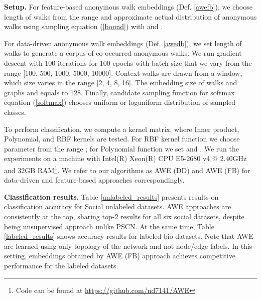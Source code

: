 \documentclass{article}
\theoremstyle{definition}
\begin{document}
\textbf{Setup.}
For feature-based anonymous walk embeddings (Def. \ref{awefb}), we choose length  of walks from the range  and approximate actual distribution of anonymous walks using sampling equation (\ref{bound}) with  and . 

For data-driven anonymous walk embeddings (Def. \ref{awedb}), we set length of walks  to generate a corpus of co-occurred anonymous walks. We run gradient descent with 100 iterations for 100 epochs with batch size that we vary from the range [100, 500, 1000, 5000, 10000]. Context walks are drawn from a window, which size varies in the range [2, 4, 8, 16]. The embedding size of walks and graphs   and  equals to 128. Finally, candidate sampling function for softmax equation (\ref{softmax}) chooses uniform or loguniform distribution of sampled classes. 

To perform classification, we compute a kernel matrix, where Inner product, Polynomial, and RBF kernels are tested. For RBF kernel function we choose parameter  from the range ; for Polynomial function we set  and . We run the experiments on a machine with Intel(R) Xeon(R) CPU E5-2680 v4 @ 2.40GHz and 32GB RAM\footnote{Code can be found at \url{https://github.com/nd7141/AWE}}. We refer to our algorithms as AWE (DD) and AWE (FB) for data-driven and feature-based approaches correspondingly.

\textbf{Classification results.}
Table \ref{unlabeled_results} presents results on classification accuracy for Social unlabeled datasets. AWE approaches are consistently at the top, sharing top-2 results for all six social datasets, despite being unsupervised approach unlike PSCN. 
At the same time, Table \ref{labeled_results} shows accuracy results for labeled bio datasets. Note that AWE are learned using only topology of the network and not node/edge labels. In this setting, embeddings obtained by AWE (FB) approach achieves competitive performance for the labeled datasets. 
\end{document}
